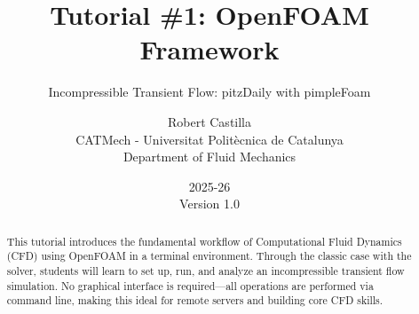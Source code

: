 \documentclass[
    parskip=half,      %
    DIV=12,            %
    headings=normal,   %
    fontsize=11pt,     %
    english            %
]{scrartcl}
\begin{document}
\title{Tutorial \#1: OpenFOAM Framework}
\subtitle{Incompressible Transient Flow: pitzDaily with pimpleFoam}
\subject{Workshop on Computational Fluid Dynamics (CFD) \\ with OpenFOAM \\ IMP-PAN Gdansk}
\author{Robert Castilla \\ CATMech - Universitat Politècnica de Catalunya \\ Department of Fluid Mechanics}
\date{2025-26 \\ Version 1.0}



\maketitle

\begin{abstract}
This tutorial introduces the fundamental workflow of Computational Fluid Dynamics (CFD) using OpenFOAM in a terminal environment. 
Through the classic  case with the  solver, students will learn to set up, run, and 
analyze an incompressible transient flow simulation. No graphical interface is required—all operations are performed via command line, 
making this ideal for remote servers and building core CFD skills.
\end{abstract}

\tableofcontents
\newpage

\end{document}
